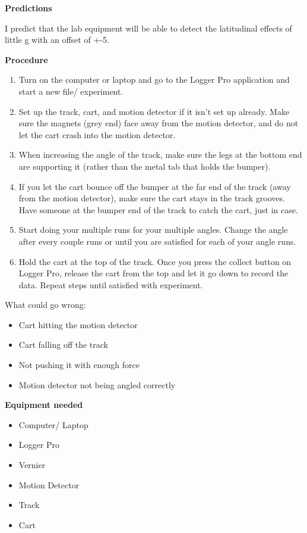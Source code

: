 \documentclass[idxtotoc,hyperref,openany]{labbook} %
\begin{document}
\hfill \break
\textbf{Predictions}

I predict that the lab equipment will be able to detect the latitudinal effects of little g with an offset of +-5.

\hfill \break
\textbf{Procedure}
\begin{enumerate}
    \item Turn on the computer or laptop and go to the Logger Pro application and start a new file/ experiment.
    \item Set up the track, cart, and motion detector if it isn't set up already. Make sure the magnets (grey end) face away from the motion detector, and do not let the cart crash into the motion detector.
    \item When increasing the angle of the track, make sure the legs at the bottom end are supporting it (rather than the metal tab that holds the bumper).
    \item If you let the cart bounce off the bumper at the far end of the track (away from the motion detector), make sure the cart stays in the track grooves. Have someone at the bumper end of the track to catch the cart, just in case.
    \item Start doing your multiple runs for your multiple angles. Change the angle after every couple runs or until you are satisfied for each of your angle runs. 
    \item Hold the cart at the top of the track. Once you press the collect button on Logger Pro, release the cart from the top and let it go down to record the data. Repeat steps until satisfied with experiment.
\end{enumerate}


\hfill \break 
What could go wrong:
\begin{itemize}
    \item Cart hitting the motion detector
    \item Cart falling off the track
    \item Not pushing it with enough force
    \item Motion detector not being angled correctly
\end{itemize}

\hfill \break
\textbf{Equipment needed}
\begin{itemize}
    \item Computer/ Laptop
    \item Logger Pro
    \item Vernier
    \item Motion Detector
    \item Track
    \item Cart
\end{itemize}
\end{document}
